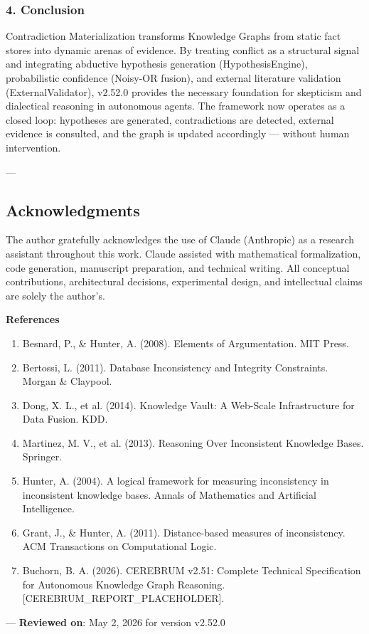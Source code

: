 \subsubsection{4. Conclusion}
Contra\-diction Materi\-alization transforms Knowledge Graphs from static fact stores into dynamic arenas of evidence. By treating conflict as a structural signal and integrating abductive hypothesis generation (HypothesisEngine), proba\-bilistic confidence (Noisy-OR fusion), and external literature validation (ExternalValidator), v2.52.0 provides the necessary foundation for skepticism and dialectical reasoning in autonomous agents. The framework now operates as a closed loop: hypotheses are generated, contr\-adictions are detected, external evidence is consulted, and the graph is updated accordingly — without human inter\-vention.

---
\subsection{Acknow\-ledgments}

The author gratefully ackno\-wledges the use of Claude (Anthropic) as a research assistant throughout this work. Claude assisted with mathe\-matical forma\-lization, code generation, manuscript preparation, and technical writing. All conceptual contr\-ibutions, archi\-tectural decisions, exper\-imental design, and intel\-lectual claims are solely the author's.

\textbf{References}
\begin{enumerate}
\item Besnard, P., \& Hunter, A. (2008). Elements of Argume\-ntation. MIT Press.
\item Bertossi, L. (2011). Database Incons\-istency and Integrity Constraints. Morgan \& Claypool.
\item Dong, X. L., et al. (2014). Knowledge Vault: A Web-Scale Infras\-tructure for Data Fusion. KDD.
\item Martinez, M. V., et al. (2013). Reasoning Over Incons\-istent Knowledge Bases. Springer.
\item Hunter, A. (2004). A logical framework for measuring incon\-sistency in incon\-sistent knowledge bases. Annals of Mathematics and Artificial Intell\-igence.
\item Grant, J., \& Hunter, A. (2011). Distance-based measures of incon\-sistency. ACM Transa\-ctions on Comput\-ational Logic.
\item Buchorn, B. A. (2026). CEREBRUM v2.51: Complete Technical Specif\-ication for Autonomous Knowledge Graph Reasoning. [CEREBRUM\_REPORT\_PLACEHOLDER].

\end{enumerate}
---
\textbf{Reviewed on}: May 2, 2026 for version v2.52.0
